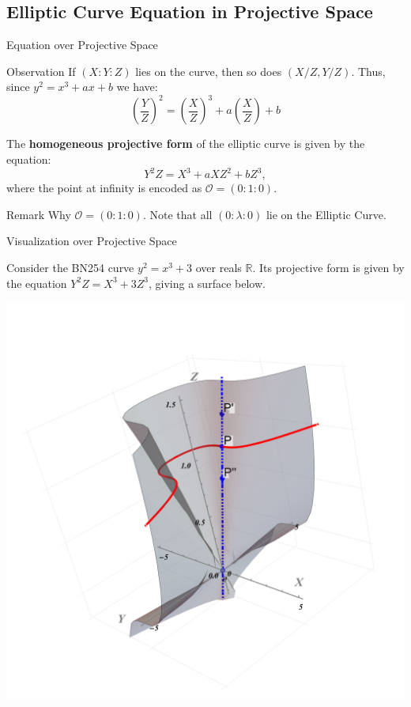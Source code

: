 \documentclass[xcolor={usenames,dvipsnames}]{beamer}
\begin{document}
    \subsection{Elliptic Curve Equation in Projective Space}
    \begin{frame}{Equation over Projective Space}
        \begin{block}{Observation}
            If $(X:Y:Z)$ lies on the curve, then so does $(X/Z,Y/Z)$. \pause Thus, since $y^2=x^3+ax+b$ we have:
            \begin{equation*}
                \left(\frac{Y}{Z}\right)^2 = \left(\frac{X}{Z}\right)^3 + a\left(\frac{X}{Z}\right) + b
            \end{equation*}
        \end{block}

        \pause\begin{definition}
            The \textbf{homogeneous projective form} of the elliptic curve is given by the equation:
            \begin{equation*}
                Y^2Z = X^3 + aXZ^2 + bZ^3,
            \end{equation*}
            where the point at infinity is encoded as $\mathcal{O} = (0:1:0)$.
        \end{definition}

        \pause\begin{block}{Remark}
            Why $\mathcal{O} = (0:1:0)$. Note that all $(0:\lambda:0)$ lie on the Elliptic Curve.
        \end{block}
    \end{frame}

    \begin{frame}{Visualization over Projective Space}
        \begin{example}
            Consider the BN254 curve $y^2 = x^3 + 3$ over reals $\mathbb{R}$. Its projective form is given by the equation $Y^2Z = X^3 + 3Z^3$, giving a surface below.
            \begin{center}
                \includegraphics[trim={275 100 225 100}, width=0.3\linewidth, clip]{images/lecture_4/projective_ec.pdf}        
            \end{center}
        \end{example}
    \end{frame}
\end{document}
